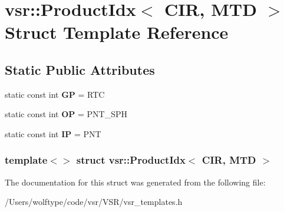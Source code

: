 \hypertarget{structvsr_1_1_product_idx_3_01_c_i_r_00_01_m_t_d_01_4}{\section{vsr\-:\-:Product\-Idx$<$ C\-I\-R, M\-T\-D $>$ Struct Template Reference}
\label{structvsr_1_1_product_idx_3_01_c_i_r_00_01_m_t_d_01_4}
}
\subsection*{Static Public Attributes}
\begin{DoxyCompactItemize}
\item 
\hypertarget{structvsr_1_1_product_idx_3_01_c_i_r_00_01_m_t_d_01_4_a3d43c53aafcb9cf8d269c7670f856adf}{static const int {\bfseries G\-P} = R\-T\-C}\label{structvsr_1_1_product_idx_3_01_c_i_r_00_01_m_t_d_01_4_a3d43c53aafcb9cf8d269c7670f856adf}

\item 
\hypertarget{structvsr_1_1_product_idx_3_01_c_i_r_00_01_m_t_d_01_4_acb8be9ae08c702660e44b5bd2049eb78}{static const int {\bfseries O\-P} = P\-N\-T\-\_\-\-S\-P\-H}\label{structvsr_1_1_product_idx_3_01_c_i_r_00_01_m_t_d_01_4_acb8be9ae08c702660e44b5bd2049eb78}

\item 
\hypertarget{structvsr_1_1_product_idx_3_01_c_i_r_00_01_m_t_d_01_4_a524de3f24c75ccaa76d53bd7b763a310}{static const int {\bfseries I\-P} = P\-N\-T}\label{structvsr_1_1_product_idx_3_01_c_i_r_00_01_m_t_d_01_4_a524de3f24c75ccaa76d53bd7b763a310}

\end{DoxyCompactItemize}
\subsubsection*{template$<$$>$ struct vsr\-::\-Product\-Idx$<$ C\-I\-R, M\-T\-D $>$}



The documentation for this struct was generated from the following file\-:\begin{DoxyCompactItemize}
\item 
/\-Users/wolftype/code/vsr/\-V\-S\-R/vsr\-\_\-templates.\-h\end{DoxyCompactItemize}
